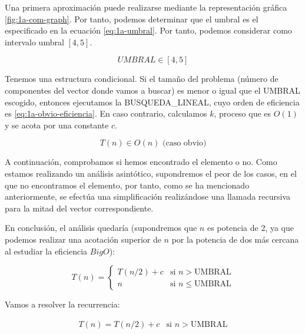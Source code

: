 Una primera aproximación puede realizarse mediante la representación gráfica \ref{fig:1a-com-graph}. Por tanto, podemos
determinar que el umbral es el especificado en la ecuación \ref{eq:1a-umbral}. Por tanto, podemos considerar como intervalo
umbral $[4,5]$. 

\begin{equation}
	UMBRAL \in [4,5]
	\label{eq:1a-umbral}
\end{equation}


Tenemos una estructura condicional. Si el tamaño del problema (número de componentes del vector donde 
vamos a buscar) es menor o igual que el UMBRAL escogido, entonces ejecutamos la BUSQUEDA\_LINEAL, cuyo orden de eficiencia es \ref{eq:1a-obvio-eficiencia}. 
En caso contrario, calculamos $k$, proceso que es $O(1)$ y se acota por una constante $c$. 

\begin{equation}
	\boxed{T(n) \in O (n)} \text{ (caso obvio)}
	\label{eq:1a-obvio-eficiencia}
\end{equation}

A continuación, comprobamos si hemos encontrado el elemento o no. Como estamos realizando un análisis asintótico, supondremos
el peor de los casos, en el que no encontramos el elemento, por tanto, como se ha mencionado anteriormente,
se efectúa una simplificación realizándose una llamada recursiva para la mitad del vector correspondiente.

En conclusión, el análisis quedaría (supondremos que $n$ es potencia de 2, ya que podemos realizar una acotación 
superior de $n$ por la potencia de dos más cercana al estudiar la eficiencia $Big O$): 

\begin{equation}
    T(n) = \left\{ \begin{array}{lr} T(n/2) + c & \text{si } n > \text{UMBRAL}\\ n & \text{si } n \leqslant \text{UMBRAL} \end{array} \right.
    \label{eq:1a-efi-dyv-rec}
\end{equation}

Vamos a resolver la recurrencia:

\begin{equation}
    \begin{array}{lr}  T(n) =  T(n/2) + c & \text{si } n > \text{UMBRAL} \end{array}
    \label{eq:ejer1:efi-dyv}
\end{equation}

